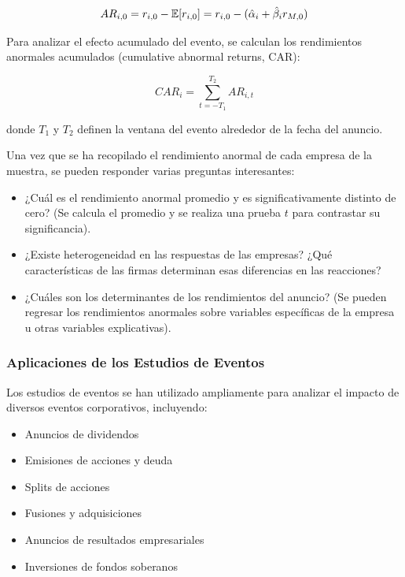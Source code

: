 \begin{equation}
AR_{i,0} = r_{i,0} - \mathbb{E}[r_{i,0}] = r_{i,0} - (\hat{\alpha}_i + \hat{\beta}_i r_{M,0})
\end{equation}

Para analizar el efecto acumulado del evento, se calculan los rendimientos anormales acumulados (cumulative abnormal returns, CAR):

\begin{equation}
CAR_i = \sum_{t=-T_1}^{T_2} AR_{i,t}
\end{equation}

donde $T_1$ y $T_2$ definen la ventana del evento alrededor de la fecha del anuncio.

Una vez que se ha recopilado el rendimiento anormal de cada empresa de la muestra, se pueden responder varias preguntas interesantes:
\begin{itemize}
\item ¿Cuál es el rendimiento anormal promedio y es significativamente distinto de cero? (Se calcula el promedio y se realiza una prueba $t$ para contrastar su significancia).
\item ¿Existe heterogeneidad en las respuestas de las empresas? ¿Qué características de las firmas determinan esas diferencias en las reacciones?
\item ¿Cuáles son los determinantes de los rendimientos del anuncio? (Se pueden regresar los rendimientos anormales sobre variables específicas de la empresa u otras variables explicativas).
\end{itemize}

\subsubsection{Aplicaciones de los Estudios de Eventos}

Los estudios de eventos se han utilizado ampliamente para analizar el impacto de diversos eventos corporativos, incluyendo:

\begin{itemize}
\item Anuncios de dividendos
\item Emisiones de acciones y deuda
\item Splits de acciones
\item Fusiones y adquisiciones
\item Anuncios de resultados empresariales
\item Inversiones de fondos soberanos
\end{itemize}

